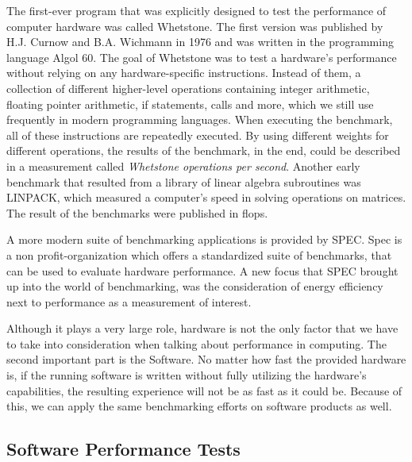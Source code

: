 The first-ever program that was explicitly designed to test the performance of
computer hardware was called Whetstone. The first version was published by H.J.
Curnow and B.A. Wichmann in 1976 and was written in the programming language
Algol 60. The goal of Whetstone was to test a hardware's performance without
relying on any hardware-specific instructions. Instead of them, a collection of
different higher-level operations containing integer arithmetic, floating
pointer arithmetic, if statements, calls and more, which we still use frequently
in modern programming languages. When executing the benchmark, all of these
instructions are repeatedly executed. By using different weights for different
operations, the results of the benchmark, in the end, could be described in a
measurement called \emph{Whetstone operations per second}.  Another early
benchmark that resulted from a library of linear algebra subroutines was
LINPACK, which measured a computer's speed in solving operations on matrices. The
result of the benchmarks were published in \gls{flops}.
\cite{OverviewBenchmarks}

A more modern suite of benchmarking applications is provided by SPEC. Spec is a
non profit-organization which offers a standardized suite of benchmarks, that
can be used to evaluate hardware performance. A new focus that SPEC brought up
into the world of benchmarking, was the consideration of energy efficiency next
to performance as a measurement of interest.
\cite{Spec}

Although it plays a very large role, hardware is not the only factor that we
have to take into consideration when talking about performance in computing. The
second important part is the Software. No matter how fast the provided hardware
is, if the running software is written without fully utilizing the hardware's
capabilities, the resulting experience will not be as fast as it could be.
Because of this, we can apply the same benchmarking efforts on software products
as well.



\subsection{Software Performance Tests}

